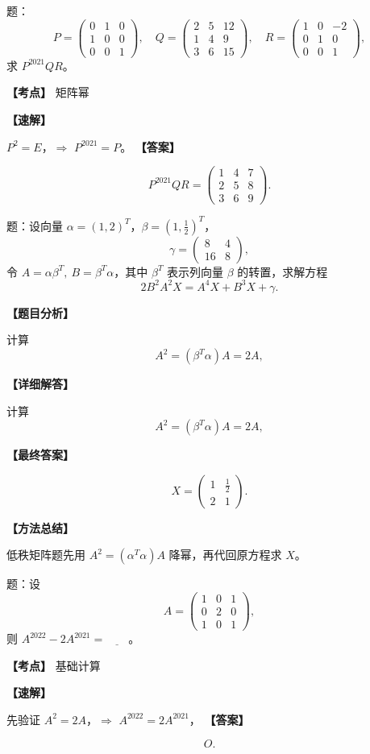 ﻿\documentclass[11pt,a4paper,UTF8]{ctexart}
\begin{document}
\begin{answerbox}[2020--2021 填空 4：置换矩阵幂]
题：
\[
P=\begin{pmatrix}0&1&0\\1&0&0\\0&0&1\end{pmatrix},\quad
Q=\begin{pmatrix}2&5&12\\1&4&9\\3&6&15\end{pmatrix},\quad
R=\begin{pmatrix}1&0&-2\\0&1&0\\0&0&1\end{pmatrix},
\]
求 $P^{2021}QR$。

\textbf{【考点】} 矩阵幂

\textbf{【速解】}

$P^2=E$，$\Rightarrow$ $P^{2021}=P$。
\textbf{【答案】}

\[
P^{2021}QR=
\begin{pmatrix}
1&4&7\\
2&5&8\\
3&6&9
\end{pmatrix}.
\]
\end{answerbox}
\begin{answerbox}
题：设向量 $\alpha=(1,2)^T$，$\beta=\left(1,\frac12\right)^T$，
\[
\gamma=\begin{pmatrix}8&4\\16&8\end{pmatrix},
\]
令 $A=\alpha\beta^T,\ B=\beta^T\alpha$，其中 $\beta^T$ 表示列向量 $\beta$ 的转置，求解方程
\[
2B^2A^2X=A^4X+B^3X+\gamma.
\]

\textbf{【题目分析】}

计算
\[A^2=(\beta^T\alpha)A=2A,\]

\textbf{【详细解答】}

计算
\[A^2=(\beta^T\alpha)A=2A,\]

\textbf{【最终答案】}


\[
X=
\begin{pmatrix}
1&\frac12\\
2&1
\end{pmatrix}.
\]

\textbf{【方法总结】}

低秩矩阵题先用 \(A^2=(\alpha^T\alpha)A\) 降幂，再代回原方程求 \(X\)。
\end{answerbox}
\begin{answerbox}[2021--2022 填空 2]
题：设
\[
A=\begin{pmatrix}
1&0&1\\
0&2&0\\
1&0&1
\end{pmatrix},
\]
则 $A^{2022}-2A^{2021}=\underline{\qquad}$。

\textbf{【考点】} 基础计算

\textbf{【速解】}

先验证 $A^2=2A$，$\Rightarrow$ $A^{2022}=2A^{2021}$，
\textbf{【答案】}

\[O.\]
\end{answerbox}
\end{document}
